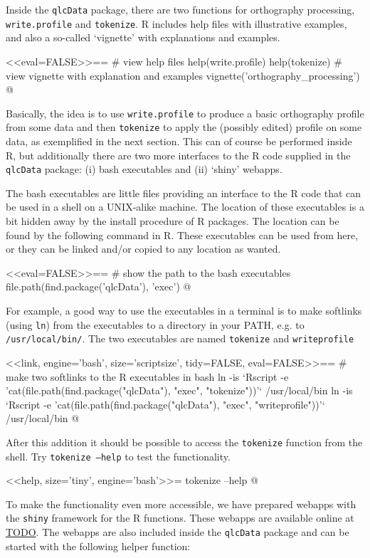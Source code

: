 \noindent Inside the \texttt{qlcData} package, there are two functions for
orthography processing, \texttt{write.profile} and \texttt{tokenize}. R includes
help files with illustrative examples, and also a so-called `vignette' with
explanations and examples.

<<eval=FALSE>>==
# view help files
help(write.profile)
help(tokenize)
# view vignette with explanation and examples
vignette('orthography_processing')
@

\noindent Basically, the idea is to use \texttt{write.profile} to produce a
basic orthography profile from some data and then \texttt{tokenize} to apply the
(possibly edited) profile on some data, as exemplified in the next section. This
can of course be performed inside R, but additionally there are two more
interfaces to the R code supplied in the \texttt{qlcData} package: (i) bash
executables and (ii) `shiny' webapps.

The bash executables are little files providing an interface to the R code that
can be used in a shell on a UNIX-alike machine. The location of these
executables is a bit hidden away by the install procedure of R packages. The
location can be found by the following command in R. These executables can be 
used from here, or they can be linked and/or copied to any location as wanted.

<<eval=FALSE>>==
# show the path to the bash executables
file.path(find.package('qlcData'), 'exec')
@

\noindent For example, a good way to use the executables in a terminal is to
make softlinks (using \texttt{ln}) from the executables to a directory in your
PATH, e.g. to \texttt{/usr/local/bin/}. The two executables are named
\texttt{tokenize} and \texttt{writeprofile}

<<link, engine='bash', size='scriptsize', tidy=FALSE, eval=FALSE>>==
# make two softlinks to the R executables in bash
ln -is `Rscript -e 'cat(file.path(find.package("qlcData"),
 "exec", "tokenize"))'` /usr/local/bin
ln -is `Rscript -e 'cat(file.path(find.package("qlcData"),
 "exec", "writeprofile"))'` /usr/local/bin
@

\noindent After this addition it should be possible to access the \texttt{tokenize}
function from the shell. Try \texttt{tokenize --help} to test the functionality.

<<help, size='tiny', engine='bash'>>=
tokenize --help
@

To make the functionality even more accessible, we have prepared webapps with 
the \texttt{shiny} framework for the R functions. These webapps are available 
online at \url{TODO}. The webapps are also included inside the \texttt{qlcData} 
package and can be started with the following helper function:

